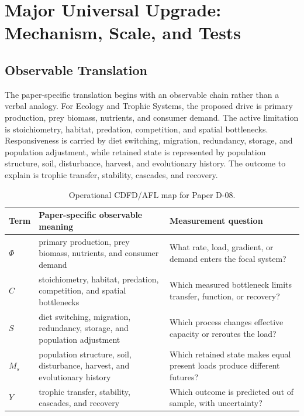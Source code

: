 \documentclass[11pt]{article}
\begin{document}
\section{Major Universal Upgrade: Mechanism, Scale, and Tests}

\subsection{Observable Translation}

The paper-specific translation begins with an observable chain rather than a
verbal analogy. For Ecology and Trophic Systems, the proposed drive is primary production, prey biomass, nutrients, and consumer demand.
The active limitation is stoichiometry, habitat, predation, competition, and spatial bottlenecks. Responsiveness is carried by
diet switching, migration, redundancy, storage, and population adjustment, while retained state is represented by
population structure, soil, disturbance, harvest, and evolutionary history. The outcome to explain is trophic transfer, stability, cascades, and recovery.

\begin{table}[htbp]
\centering
\small
\caption{Operational CDFD/AFL map for Paper D-08.}
\begin{tabularx}{\textwidth}{|l|X|X|}
\hline
\textbf{Term} & \textbf{Paper-specific observable meaning} & \textbf{Measurement question} \\
\hline
$\Phi$ & primary production, prey biomass, nutrients, and consumer demand & What rate, load, gradient, or demand enters the focal system? \\
\hline
$C$ & stoichiometry, habitat, predation, competition, and spatial bottlenecks & Which measured bottleneck limits transfer, function, or recovery? \\
\hline
$S$ & diet switching, migration, redundancy, storage, and population adjustment & Which process changes effective capacity or reroutes the load? \\
\hline
$M_s$ & population structure, soil, disturbance, harvest, and evolutionary history & Which retained state makes equal present loads produce different futures? \\
\hline
$Y$ & trophic transfer, stability, cascades, and recovery & Which outcome is predicted out of sample, with uncertainty? \\
\hline
\end{tabularx}
\end{table}
\end{document}
